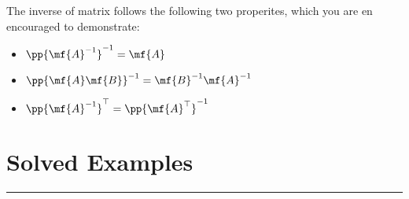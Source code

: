 The inverse of matrix follows the following two properites, which you are en encouraged to demonstrate:
\begin{itemize}
    \item $\pp{\mf{A}^{-1}}^{-1} = \mf{A}$
    \item $\pp{\mf{A}\mf{B}}^{-1} = \mf{B}^{-1}\mf{A}^{-1}$
    \item $\pp{\mf{A}^{-1}}^{\top} = \pp{\mf{A}^{\top}}^{-1}$
\end{itemize}
\newpage

\section{Solved Examples}
\vspace{-0.5cm}
\begin{center}
    \rule{\textwidth}{1pt}
\end{center}

